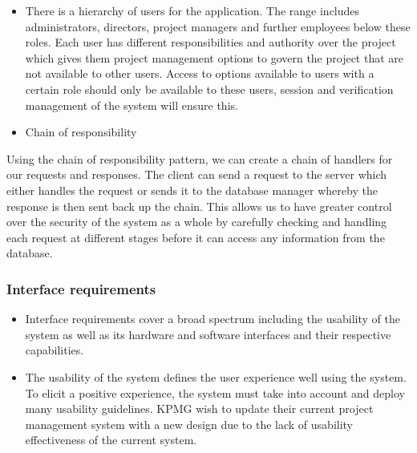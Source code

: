 \documentclass[a4paper,12pt]{article}
\begin{document}
	\begin{itemize}
		\item There is a hierarchy of users for the application. The range includes administrators, directors, project managers and further employees below these roles. Each user has different responsibilities and authority over the project which gives them project management options to govern the project that are not available to other users. Access to options available to users with a certain role should only be available to these users, session and verification management of the system will ensure this.
	\end{itemize}
	
	\textbf{}
	\begin{itemize}
		\item Chain of responsibility
	\end{itemize}
	Using the chain of responsibility pattern, we can create a chain of handlers for our requests and responses. The client can send a request to the server which either handles the request or sends it to the database manager whereby the response is then sent back up the chain. This allows us to have greater control over the security of the system as a whole by carefully checking and handling each request at different stages before it can access any information from the database.
	
	\subsubsection{Interface requirements}
	\begin{itemize}
		\item Interface requirements cover a broad spectrum including the usability of the system as well as its hardware and software interfaces and their respective capabilities. 
		
		\item The usability of the system defines the user experience well using the system. To elicit a positive experience, the system must take into account and deploy many usability guidelines. KPMG wish to update their current project management system with a new design due to the lack of usability effectiveness of the current system. 
		
	\end{itemize}
	
\end{document}

